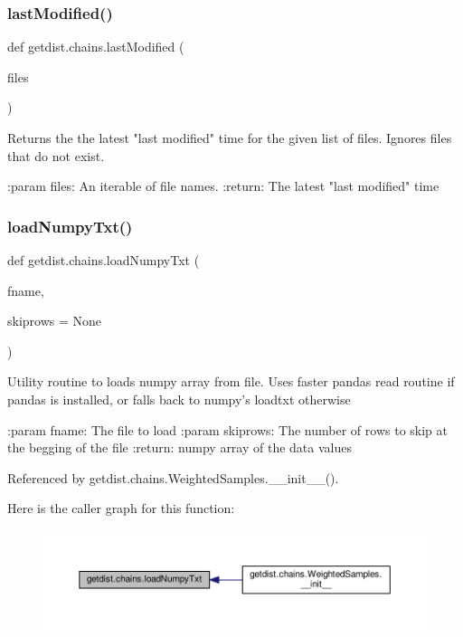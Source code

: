 \subsubsection{\texorpdfstring{last\+Modified()}{lastModified()}}
{\footnotesize\ttfamily def getdist.\+chains.\+last\+Modified (\begin{DoxyParamCaption}\item[{}]{files }\end{DoxyParamCaption})}

\begin{DoxyVerb}Returns the the latest "last modified" time for the given list of files. Ignores files that do not exist.

:param files: An iterable of file names.
:return: The latest "last modified" time
\end{DoxyVerb}
 \mbox{\label{namespacegetdist_1_1chains_a92803119cc9c25b30dfe65c226c9a2e9}} 
\subsubsection{\texorpdfstring{load\+Numpy\+Txt()}{loadNumpyTxt()}}
{\footnotesize\ttfamily def getdist.\+chains.\+load\+Numpy\+Txt (\begin{DoxyParamCaption}\item[{}]{fname,  }\item[{}]{skiprows = {\ttfamily None} }\end{DoxyParamCaption})}

\begin{DoxyVerb}Utility routine to loads numpy array from file.
Uses faster pandas read routine if pandas is installed, or falls back to numpy's loadtxt otherwise
  
:param fname: The file to load
:param skiprows: The number of rows to skip at the begging of the file
:return: numpy array of the data values
\end{DoxyVerb}
 

Referenced by getdist.\+chains.\+Weighted\+Samples.\+\_\+\+\_\+init\+\_\+\+\_\+().

Here is the caller graph for this function\+:
\nopagebreak
\begin{figure}[H]
\begin{center}
\leavevmode
\includegraphics[width=350pt]{namespacegetdist_1_1chains_a92803119cc9c25b30dfe65c226c9a2e9_icgraph}
\end{center}
\end{figure}


